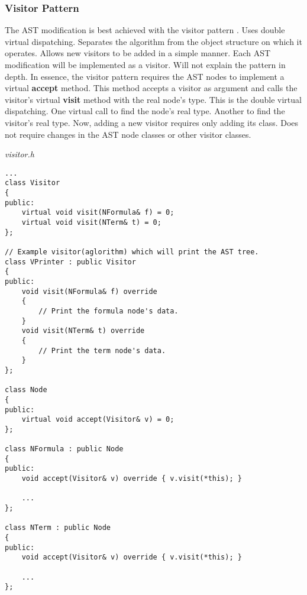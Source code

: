 \documentclass{article}
\begin{document}

	\subsubsection{Visitor Pattern} The AST modification is best achieved with the visitor pattern \cite{visitor-pattern}. Uses double virtual dispatching. Separates the algorithm from the object structure on which it operates. Allows new visitors to be added in a simple manner. Each AST modification will be implemented as a visitor. Will not explain the pattern in depth. In essence, the visitor pattern requires the AST nodes to implement a virtual \textbf{accept} method. This method accepts a visitor as argument and calls the visitor's virtual \textbf{visit} method with the real node's type. This is the double virtual dispatching. One virtual call to find the node's real type. Another to find the visitor's real type. Now, adding a new visitor requires only adding its class. Does not require changes in the AST node classes or other visitor classes.

\newpage
\noindent
\textit{visitor.h}
\begin{lstlisting}
...
class Visitor
{
public:
    virtual void visit(NFormula& f) = 0;
    virtual void visit(NTerm& t) = 0;
};

// Example visitor(aglorithm) which will print the AST tree.
class VPrinter : public Visitor
{
public:
    void visit(NFormula& f) override
    {
        // Print the formula node's data.
    }
    void visit(NTerm& t) override
    {
        // Print the term node's data.
    }
};

class Node
{
public:
    virtual void accept(Visitor& v) = 0;
};

class NFormula : public Node
{
public:
    void accept(Visitor& v) override { v.visit(*this); }

    ...
};

class NTerm : public Node
{
public:
    void accept(Visitor& v) override { v.visit(*this); }

    ...
};
\end{lstlisting}
\end{document}
